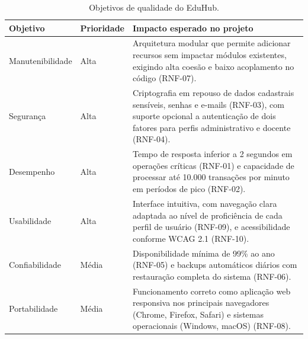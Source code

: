 \begin{table}[ht]
\centering
\caption{Objetivos de qualidade do EduHub.}
\label{tab:objetivos-qualidade}
\setlength{\tabcolsep}{10pt}
\begin{tabularx}{\textwidth}{p{} p{} X}
\toprule
\textbf{Objetivo} & \textbf{Prioridade} & \textbf{Impacto esperado no projeto} \\
\midrule
Manutenibilidade & Alta & Arquitetura modular que permite adicionar recursos sem impactar módulos existentes, exigindo alta coesão e baixo acoplamento no código (RNF-07). \\
Segurança & Alta & Criptografia em repouso de dados cadastrais sensíveis, senhas e e-mails (RNF-03), com suporte opcional a autenticação de dois fatores para perfis administrativo e docente (RNF-04). \\
Desempenho & Alta & Tempo de resposta inferior a 2 segundos em operações críticas (RNF-01) e capacidade de processar até 10.000 transações por minuto em períodos de pico (RNF-02). \\
Usabilidade & Alta & Interface intuitiva, com navegação clara adaptada ao nível de proficiência de cada perfil de usuário (RNF-09), e acessibilidade conforme WCAG 2.1 (RNF-10). \\
Confiabilidade & Média & Disponibilidade mínima de 99\% ao ano (RNF-05) e backups automáticos diários com restauração completa do sistema (RNF-06). \\
Portabilidade & Média & Funcionamento correto como aplicação web responsiva nos principais navegadores (Chrome, Firefox, Safari) e sistemas operacionais (Windows, macOS) (RNF-08). \\
\bottomrule
\end{tabularx}
\end{table}
